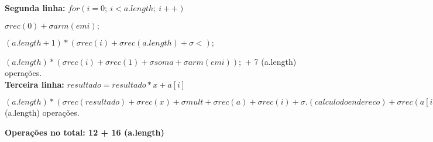 \documentclass{article}
\begin{document}
\textbf{Segunda linha:} $for(i = 0;\ i < a.length;\ i++)$

\noindent
$\sigma rec (0) + \sigma arm (em i);$

\noindent
$(a.length + 1) * (\sigma rec (i)  + \sigma rec (a.length) + \sigma <);$

\noindent
$(a.length) * (\sigma rec (i) + \sigma rec (1) + \sigma soma + \sigma arm (em i));$
\newline {} + 7 (a.length) operações.
\\

\textbf{Terceira linha:} $resultado = resultado * x + a[i]$

\noindent
$ (a.length)*(\sigma rec (resultado) + \sigma rec (x) + \sigma mult + \sigma rec (a) + \sigma rec (i) + \sigma . (calculo do endereco) + \sigma rec (a[i]) + \sigma soma + \sigma arm (em resultado));$
\newline {} (a.length) operações.

\dotfill

\textbf{Operações no total: 12 + 16 (a.length)}
\end{document}
